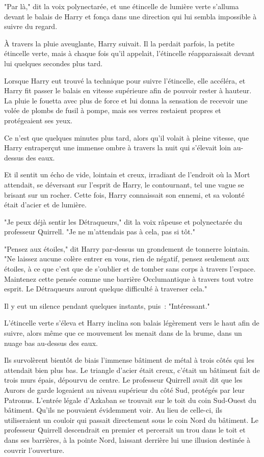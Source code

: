 "Par là," dit la voix polynectarée, et une étincelle de lumière verte s'alluma devant le balais de Harry et fonça dans une direction qui lui sembla impossible à suivre du regard.

À travers la pluie aveuglante, Harry suivait. Il la perdait parfois, la petite étincelle verte, mais à chaque fois qu'il appelait, l'étincelle réapparaissait devant lui quelques secondes plus tard.

Lorsque Harry eut trouvé la technique pour suivre l'étincelle, elle accéléra, et Harry fit passer le balais en vitesse supérieure afin de pouvoir rester à hauteur. La pluie le fouetta avec plus de force et lui donna la sensation de recevoir une volée de plombs de fusil à pompe, mais ses verres restaient propres et protégeaient ses yeux.

Ce n'est que quelques minutes plus tard, alors qu'il volait à pleine vitesse, que Harry entraperçut une immense ombre à travers la nuit qui s'élevait loin au-dessus des eaux.

Et il sentit un écho de vide, lointain et creux, irradiant de l'endroit où la Mort attendait, se déversant sur l'esprit de Harry, le contournant, tel une vague se brisant sur un rocher. Cette fois, Harry connaissait son ennemi, et sa volonté était d'acier et de lumière.

"Je peux déjà sentir les Détraqueurs," dit la voix râpeuse et polynectarée du professeur Quirrell. "Je ne m'attendais pas à cela, pas si tôt."

"Pensez aux étoiles," dit Harry par-dessus un grondement de tonnerre lointain. "Ne laissez aucune colère entrer en vous, rien de négatif, pensez seulement aux étoiles, à ce que c'est que de s'oublier et de tomber sans corps à travers l'espace. Maintenez cette pensée comme une barrière Occlumantique à travers tout votre esprit. Le Détraqueurs auront quelque difficulté à traverser cela."

Il y eut un silence pendant quelques instants, puis~: "Intéressant."

L'étincelle verte s'éleva et Harry inclina son balais légèrement vers le haut afin de suivre, alors même que ce mouvement les menait dans de la brume, dans un nuage bas au-dessus des eaux.

Ils survolèrent bientôt de biais l'immense bâtiment de métal à trois côtés qui les attendait bien plus bas. Le triangle d'acier était creux, c'était un bâtiment fait de trois murs épais, dépourvu de centre. Le professeur Quirrell avait dit que les Aurors de garde logeaient au niveau supérieur du côté Sud, protégés par leur Patronus. L'entrée légale d'Azkaban se trouvait sur le toit du coin Sud-Ouest du bâtiment. Qu'ils ne pouvaient évidemment voir. Au lieu de celle-ci, ils utiliseraient un couloir qui passait directement sous le coin Nord du bâtiment. Le professeur Quirrell descendrait en premier et percerait un trou dans le toit et dans ses barrières, à la pointe Nord, laissant derrière lui une illusion destinée à couvrir l'ouverture.

